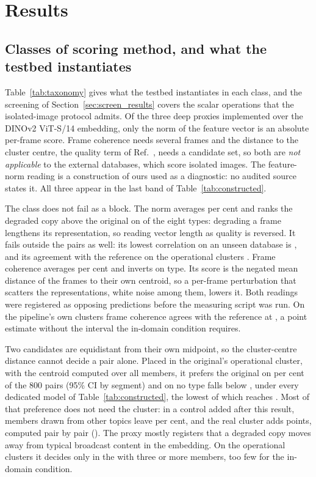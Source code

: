 \section{Results}\label{sec:results}


\subsection{Classes of scoring method, and what the testbed instantiates}\label{sec:taxonomy_results}

Table~\ref{tab:taxonomy} gives what the testbed instantiates in each class, and the
screening of Section~\ref{sec:screen_results} covers the scalar operations that the
isolated-image protocol admits. Of the three deep proxies implemented over the DINOv2
ViT-S/14 embedding, only the norm of the feature vector is an absolute per-frame score.
Frame coherence needs several frames and the distance to the cluster centre, the quality
term of Ref.~\citep{jeong2016static}, needs a candidate set, so both are \emph{not
applicable} to the external databases, which score isolated images. The feature-norm reading
is a construction of ours used as a diagnostic: no audited source states it. All three appear
in the last band of Table~\ref{tab:constructed}.

The class does not fail as a block. The norm averages \taxNormaPar{} per cent and ranks
the degraded copy above the original on \taxNormaInverte{} of the eight types: degrading
a frame lengthens its representation, so reading vector length as quality is reversed. It fails outside the pairs as well: its lowest correlation on an unseen database is \taxNormaExt{}, and its agreement with the reference on the operational clusters \taxNormaPiso{}.
Frame coherence averages \taxCoerPar{} per cent and inverts on \taxCoerInverte{} type. Its
score is the negated mean distance of the frames to their own centroid, so a per-frame
perturbation that scatters the representations, white noise among them, lowers it. Both
readings were registered as opposing predictions before the measuring script was run. On
the pipeline's own clusters frame coherence agrees with the reference at
\taxCoerKappa{}, a point estimate without the interval the in-domain condition requires.

Two candidates are equidistant from their own midpoint, so the cluster-centre distance
cannot decide a pair alone. Placed in the original's operational cluster, with the
centroid computed over all members, it prefers the original on \taxCentPar{} per cent of
the 800 pairs (95\% CI \taxCentIC{} by segment) and on no type falls below
\taxCentMin{}, under every dedicated model of Table~\ref{tab:constructed}, the lowest of which reaches \taxModeloMin{}. Most of that preference does not need the cluster: in a control added after this
result, members drawn from other topics leave \taxCentOutros{} per cent, and the real
cluster adds \taxCentDif{} points, computed pair by pair (\taxCentDifIC{}). The proxy mostly registers
that a degraded copy moves away from typical broadcast content in the embedding. On the operational clusters it decides only in the \taxCentroideDecide{} with three or more members, too few for the in-domain condition.


